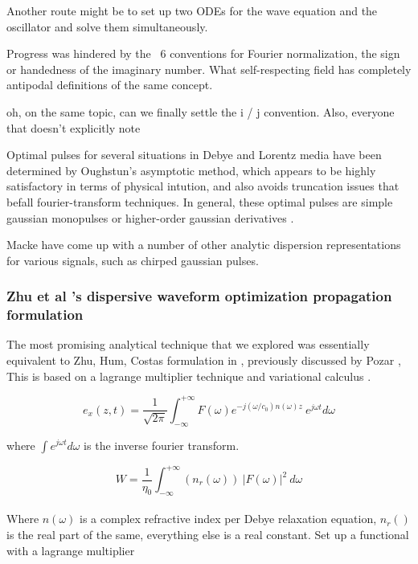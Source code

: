 \documentclass[paper.tex]{subfiles}
\begin{document}
Another route might be to set up two ODEs for the wave equation and the oscillator and solve them simultaneously.

Progress was hindered by the ~6 conventions for Fourier normalization, the sign or handedness of the imaginary number. What self-respecting field has completely antipodal definitions of the same concept.

oh, on the same topic, can we finally settle the i / j convention. Also, everyone that doesn't explicitly note  

Optimal pulses for several situations in Debye and Lorentz media have been determined by Oughstun's asymptotic method, which appears to be highly satisfactory in terms of physical intution, and also avoids truncation issues that befall fourier-transform techniques. In general, these optimal pulses are simple gaussian monopulses or higher-order gaussian derivatives \cite{Optimal2017} \cite{Optimal2015}. 

Macke \cite{Simple2012} have come up with a number of other analytic dispersion representations for various signals, such as chirped gaussian pulses.



\subsubsection{Zhu et al 's dispersive waveform optimization propagation formulation}

The most promising analytical technique that we explored was essentially equivalent to Zhu, Hum, 
Costas formulation in \cite{Microwave2012b}, previously discussed by Pozar \cite{Waveform2003}, 
This is based on a lagrange multiplier technique\cite{Methods1989} and variational 
calculus\footnotetext{} .

$$ e_x(z,t) = \frac{1}{\sqrt{2 \pi}} \int_{-\infty}^{+\infty}{F(\omega) e^{- j (\omega/c_0)n(\omega)z}\ e^{j\omega t} d\omega} $$

where $\int e^{j \omega t} d\omega$ is the inverse fourier transform.

$$W = \frac{1}{\eta_0} \int_{-\infty}^{+\infty}{(n_r(\omega))\ |F(\omega)|^2}\ d\omega$$\\

Where $n(\omega)$ is a complex refractive index per Debye relaxation equation, $n_r()$ is the real part of the same, everything else is a real constant. Set up a functional with a lagrange multiplier\\
\end{document}
